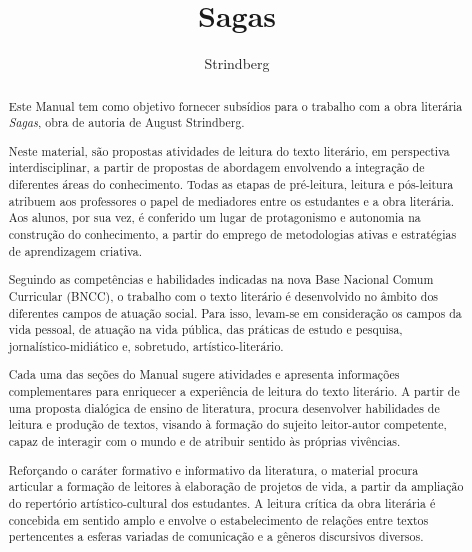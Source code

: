 \documentclass{extarticle}
\begin{document}
\newcommand{\AutorLivro}{Strindberg}
\newcommand{\TituloLivro}{Sagas}
\newcommand{\Tema}{Ficção, mistério e fantasia}
\newcommand{\Genero}{Conto, crônica e novela}
\newcommand{\imagemCapa}{./images/PNLD0040-01.png}
\newcommand{\issnppub}{---}
\newcommand{\issnepub}{---}
\newcommand{\colaborador}{\textbf{Bruno Gradella e Vicente Castro} é uma pessoa incrível e vai fazer um bom serviço.}


\title{\TituloLivro}
\author{\AutorLivro}
\def\authornotes{\colaborador}

\date{}
\maketitle

\begin{abstract}
Este Manual tem como objetivo fornecer subsídios para o trabalho com a
obra literária \emph{Sagas}, obra de autoria de August Strindberg.

Neste material, são propostas atividades de leitura do texto literário,
em perspectiva interdisciplinar, a partir de propostas de abordagem
envolvendo a integração de diferentes áreas do conhecimento. Todas as
etapas de pré-leitura, leitura e pós-leitura atribuem aos professores o
papel de mediadores entre os estudantes e a obra literária. Aos alunos,
por sua vez, é conferido um lugar de protagonismo e autonomia na
construção do conhecimento, a partir do emprego de metodologias ativas e
estratégias de aprendizagem criativa.

Seguindo as competências e habilidades indicadas na nova Base Nacional
Comum Curricular (BNCC), o trabalho com o texto literário é desenvolvido
no âmbito dos diferentes campos de atuação social. Para isso, levam-se
em consideração os campos da vida pessoal, de atuação na vida pública,
das práticas de estudo e pesquisa, jornalístico-midiático e, sobretudo,
artístico-literário.

Cada uma das seções do Manual sugere atividades e apresenta informações
complementares para enriquecer a experiência de leitura do texto
literário. A partir de uma proposta dialógica de ensino de literatura,
procura desenvolver habilidades de leitura e produção de textos, visando
à formação do sujeito leitor-autor competente, capaz de interagir com o
mundo e de atribuir sentido às próprias vivências.

Reforçando o caráter formativo e informativo da literatura, o material
procura articular a formação de leitores à elaboração de projetos de
vida, a partir da ampliação do repertório artístico-cultural dos
estudantes. A leitura crítica da obra literária é concebida em sentido
amplo e envolve o estabelecimento de relações entre textos pertencentes
a esferas variadas de comunicação e a gêneros discursivos diversos.


\end{abstract}
\end{document}
